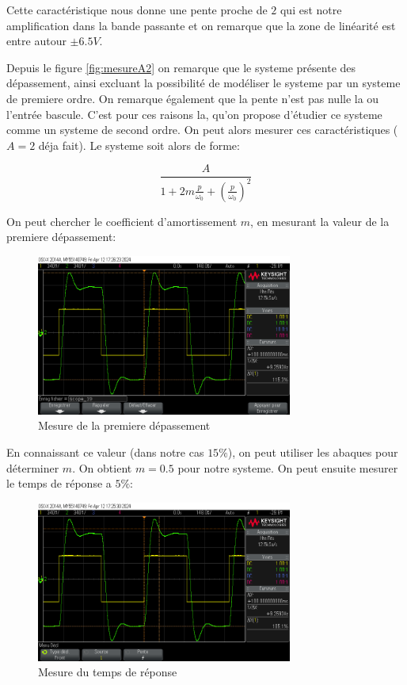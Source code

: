 \documentclass[12pt, a4paper]{report}
\begin{document}
Cette caractéristique nous donne une pente proche de $2$ qui est notre amplification dans la bande passante et 
on remarque que la zone de linéarité est entre autour $\pm 6.5 V$.

Depuis le figure \ref{fig:mesureA2} on remarque que le systeme présente des dépassement, ainsi excluant la possibilité
de modéliser le systeme par un systeme de premiere ordre. On remarque également que la pente n'est pas nulle la ou l'entrée bascule.
C'est pour ces raisons la, qu'on propose d'étudier ce systeme comme un systeme de second ordre. On peut alors mesurer ces caractéristiques ($A = 2$ déja fait).
Le systeme soit alors de forme:

\[
    \frac{A}{1 + 2m\frac{p}{\omega_0} + \left( \frac{p}{\omega_0} \right)^2}  
\]

On peut chercher le coefficient d'amortissement $m$, en mesurant la valeur de la premiere dépassement:

\begin{figure}[H]
    \centering
    \includegraphics[width=0.75\textwidth]{secondsortie1erdepassementpourcent.png}
    \caption{Mesure de la premiere dépassement}
    \label{fig:1erdepassementsortie2}
\end{figure}

En connaissant ce valeur (dans notre cas $15\%$), on peut utiliser les abaques pour déterminer $m$.
On obtient $m = 0.5$ pour notre systeme. On peut ensuite mesurer le temps de réponse a $5\%$:

\begin{figure}[H]
    \centering
    \includegraphics[width=0.75\textwidth]{secondsortietr5pourcent.png}
    \caption{Mesure du temps de réponse}
    \label{fig:tr5prcsortie2}
\end{figure}
\end{document}
